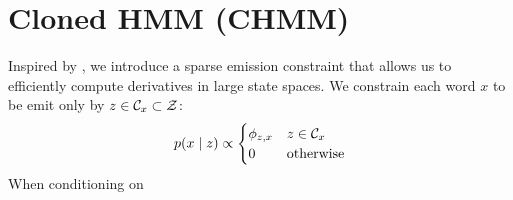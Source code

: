 \documentclass[12pt]{article}
\begin{document}
\section{Cloned HMM (CHMM)}
Inspired by \citet{dedieu2019learning},
we introduce a sparse emission constraint that allows us to
efficiently compute derivatives in large state spaces.
We constrain each word $x$ to be emit only by $z \in \mathcal{C}_x \subset \mathcal{Z}$:
\begin{equation}
p(x \mid z) \propto \begin{cases}
\phi_{z,x} & z \in \mathcal{C}_x \\
0 & \textrm{otherwise}
\end{cases}
\end{equation}
When conditioning on 



\end{document}
